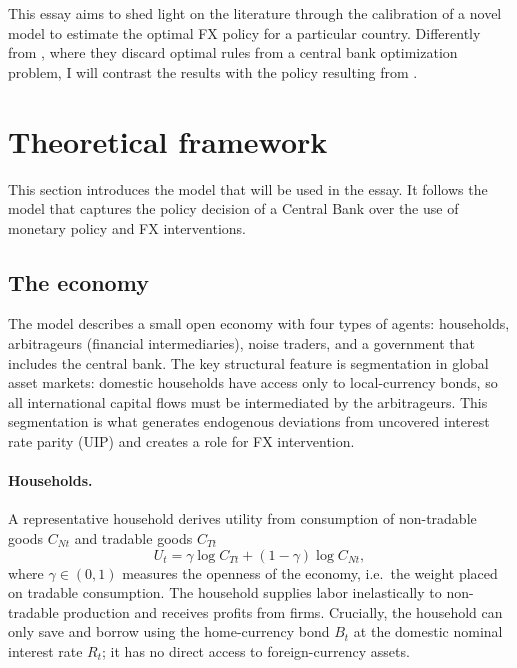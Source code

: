 \documentclass[12pt,a4paper]{article}
\begin{document}
This essay aims to shed light on the literature through the calibration of a novel model to estimate the optimal FX policy for a particular country. Differently from \cite{MONTORO2023102825}, where they discard optimal rules from a central bank optimization problem, I will contrast the results with the policy resulting from \cite{itskhokimukhin2025}.

\section{Theoretical framework}

This section introduces the model that will be used in the essay. It follows the \cite{itskhokimukhin2025} model that captures the policy decision of a Central Bank over the use of monetary policy and FX interventions.

\subsection{The economy}

The model describes a small open economy with four types of agents: households, arbitrageurs (financial intermediaries), noise traders, and a government that includes the central bank. The key structural feature is segmentation in global asset markets: domestic households have access only to local-currency bonds, so all international capital flows must be intermediated by the arbitrageurs. This segmentation is what generates endogenous deviations from uncovered interest rate parity (UIP) and creates a role for FX intervention.

\paragraph{Households.} A representative household derives utility from consumption of non-tradable goods $C_{Nt}$ and tradable goods $C_{Tt}$
\begin{equation}
    U_t = \gamma \log C_{Tt} + (1-\gamma) \log C_{Nt},
    \label{eq:utility}
\end{equation}
where $\gamma \in (0,1)$ measures the openness of the economy, i.e.\ the weight placed on tradable consumption. The household supplies labor inelastically to non-tradable production and receives profits from firms. Crucially, the household can only save and borrow using the home-currency bond $B_t$ at the domestic nominal interest rate $R_t$; it has no direct access to foreign-currency assets.
\end{document}
